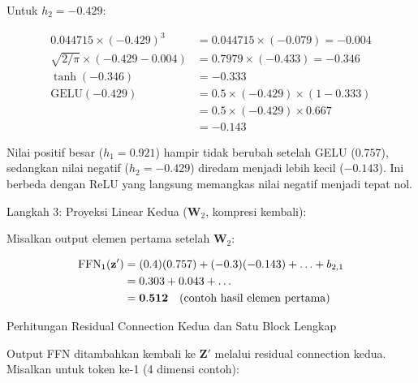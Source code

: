 \vspace{0.5cm}

\noindent Untuk $h_2 = -0.429$:\par
\begin{equation*}
\begin{aligned}
  0.044715 \times (-0.429)^3
    &= 0.044715 \times (-0.079) = -0.004 \\
  \sqrt{2/\pi} \times (-0.429 - 0.004)
    &= 0.7979 \times (-0.433) = -0.346 \\
  \tanh(-0.346)
    &= -0.333 \\
  \mathrm{GELU}(-0.429)
    &= 0.5 \times (-0.429) \times (1 - 0.333) \\
    &= 0.5 \times (-0.429) \times 0.667 \\
    &= \mathbf{-0.143}
\end{aligned}
\end{equation*}
\vspace{0.5cm}
 
\noindent
Nilai positif besar ($h_1=0.921$) hampir tidak berubah setelah GELU
($0.757$), sedangkan nilai negatif ($h_2=-0.429$) diredam menjadi
lebih kecil ($-0.143$). Ini berbeda dengan ReLU yang langsung memangkas
nilai negatif menjadi tepat nol.
 
\vspace{0.5cm}
\noindent Langkah 3: Proyeksi Linear Kedua ($\mathbf{W}_2$, kompresi kembali):
 
\vspace{0.5cm}
\noindent
Misalkan output elemen pertama setelah $\mathbf{W}_2$:
 
\vspace{0.5cm}
\begin{align*}
  \mathrm{FFN}_1(\mathbf{z}')
  &= (0.4)(0.757) + (-0.3)(-0.143) + \ldots + b_{2,1} \notag \\
  &= 0.303 + 0.043 + \ldots \notag \\
  &= \mathbf{0.512} \quad \text{(contoh hasil elemen pertama)}
\end{align*}
\vspace{0.5cm}
 
\vspace{0.5cm}
\noindent Perhitungan Residual Connection Kedua dan Satu Block Lengkap\par
\vspace{0.3cm}
 
\noindent
Output FFN ditambahkan kembali ke $\mathbf{Z}'$ melalui residual
connection kedua. Misalkan untuk token ke-1 (4 dimensi contoh):
 
